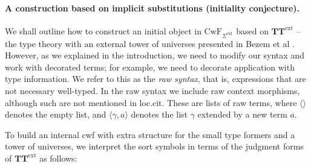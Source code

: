 \documentclass[11pt,a4paper]{article}
\theoremstyle{plain}
\theoremstyle{definition}
\newcommand{\tuple}[1]{\langle #1 \rangle}
\def\CwF{\mathrm{CwF}}
\def\Sigmaext{{\Sigma^\mathrm{ext}}}
\def\TText{{\mathbf{TT}^\mathrm{ext}}}
\begin{document}
\paragraph{A construction based on implicit substitutions (initiality conjecture).}
We shall outline how to construct an initial object in $\CwF_{\Sigmaext}$ based on $\TText$ -- the type theory with an external tower of universes presented in Bezem et al \cite{BezemCDE22}. However, as we explained in the introduction, we need to modify our syntax and work with decorated terms; for example, we need to decorate application with type information. We refer to this as the {\em raw syntax}, that is, expressions that are not necessary well-typed. In the raw syntax we include raw context morphisms, although such are not mentioned in loc.cit. These are lists of raw terms, where $\tuple{}$ denotes the empty list, and $\tuple{\gamma,a}$ denotes the list $\gamma$ extended by a new term $a$.

To build an internal cwf with extra structure for the small type formers and a tower of universes, we interpret the sort symbols in terms of the judgment forms of $\TText$ as follows:
\end{document}
